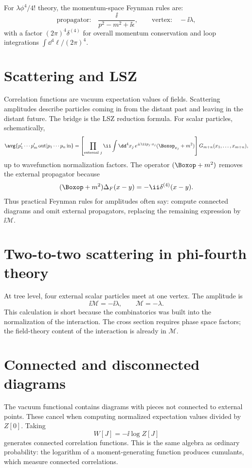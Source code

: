 For \(\lambda\phi^4/4!\) theory, the momentum-space Feynman rules are:
\[
  \text{propagator:}\quad
  \frac{\ii}{p^2-m^2+\ii\epsilon},
  \qquad
  \text{vertex:}\quad -\ii\lambda,
\]
with a factor \((2\pi)^4\delta^{(4)}\) for overall momentum conservation and loop integrations \(\int\dd^4\ell/(2\pi)^4\).

\section{Scattering and LSZ}

Correlation functions are vacuum expectation values of fields.  Scattering amplitudes describe particles coming in from the distant past and leaving in the distant future.  The bridge is the LSZ reduction formula.  For scalar particles, schematically,
\[
  \avg{p_1'\cdots p_m'\,\text{out}|p_1\cdots p_n\,\text{in}}
  =
  \left[
  \prod_{\text{external }j}
  \ii\int\dd^4x_j\,e^{\pm\ii p_j\cdot x_j}
  (\Boxop_{x_j}+m^2)
  \right]
  G_{m+n}(x_1,\ldots,x_{m+n}),
\]
up to wavefunction normalization factors.  The operator \((\Boxop+m^2)\) removes the external propagator because
\[
  (\Boxop+m^2)\Delta_F(x-y)=-\ii\delta^{(4)}(x-y).
\]
Thus practical Feynman rules for amplitudes often say: compute connected diagrams and omit external propagators, replacing the remaining expression by \(\ii\mathcal M\).

\section{Two-to-two scattering in phi-fourth theory}

At tree level, four external scalar particles meet at one vertex.  The amplitude is
\[
  \ii\mathcal M=-\ii\lambda,
  \qquad
  \mathcal M=-\lambda.
\]
This calculation is short because the combinatorics was built into the normalization of the interaction.  The cross section requires phase space factors; the field-theory content of the interaction is already in \(\mathcal M\).

\section{Connected and disconnected diagrams}

The vacuum functional contains diagrams with pieces not connected to external points.  These cancel when computing normalized expectation values divided by \(Z[0]\).  Taking
\[
  W[J]=-\ii\log Z[J]
\]
generates connected correlation functions.  This is the same algebra as ordinary probability: the logarithm of a moment-generating function produces cumulants, which measure connected correlations.

